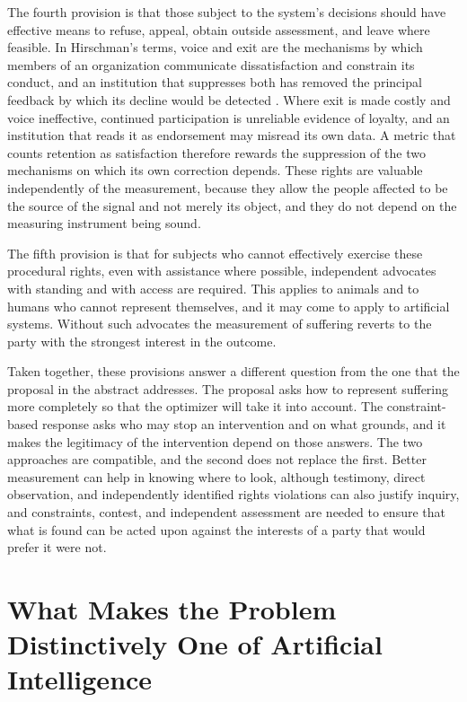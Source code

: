 \documentclass[11pt]{article}
\begin{document}
The fourth provision is that those subject to the system's decisions should have effective means to refuse, appeal, obtain outside assessment, and leave where feasible. In Hirschman's terms, voice and exit are the mechanisms by which members of an organization communicate dissatisfaction and constrain its conduct, and an institution that suppresses both has removed the principal feedback by which its decline would be detected \citep{hirschman1970}. Where exit is made costly and voice ineffective, continued participation is unreliable evidence of loyalty, and an institution that reads it as endorsement may misread its own data. A metric that counts retention as satisfaction therefore rewards the suppression of the two mechanisms on which its own correction depends. These rights are valuable independently of the measurement, because they allow the people affected to be the source of the signal and not merely its object, and they do not depend on the measuring instrument being sound.

The fifth provision is that for subjects who cannot effectively exercise these procedural rights, even with assistance where possible, independent advocates with standing and with access are required. This applies to animals and to humans who cannot represent themselves, and it may come to apply to artificial systems. Without such advocates the measurement of suffering reverts to the party with the strongest interest in the outcome.

Taken together, these provisions answer a different question from the one that the proposal in the abstract addresses. The proposal asks how to represent suffering more completely so that the optimizer will take it into account. The constraint-based response asks who may stop an intervention and on what grounds, and it makes the legitimacy of the intervention depend on those answers. The two approaches are compatible, and the second does not replace the first. Better measurement can help in knowing where to look, although testimony, direct observation, and independently identified rights violations can also justify inquiry, and constraints, contest, and independent assessment are needed to ensure that what is found can be acted upon against the interests of a party that would prefer it were not.

\section{What Makes the Problem Distinctively One of Artificial Intelligence}
\end{document}
